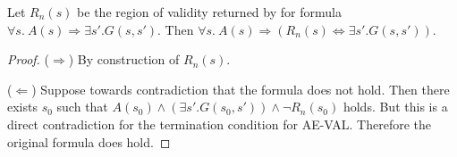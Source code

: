 

\begin{lemma}\label{lem:aeval}
  Let $R_n(s)$ be the region of validity returned by \aeval for  formula $\forall
  s.~ A(s) \Rightarrow \exists s'. G(s, s')$. Then
$  \forall s.~ A(s) \Rightarrow (R_n(s) \Leftrightarrow \exists s'. G(s, s'))$.
\end{lemma}
\begin{proof}
  ($\Rightarrow$) By construction of $R_n(s)$.

  ($\Leftarrow$) Suppose towards contradiction that the formula does
  not hold. Then there exists $s_0$ such that $A(s_0) \land (\exists
  s'. G(s_0, s')) \land \neg R_n(s_0)$ holds. But this is a direct
  contradiction for the termination condition for AE-VAL. Therefore
  the original formula does hold.
\end{proof}



